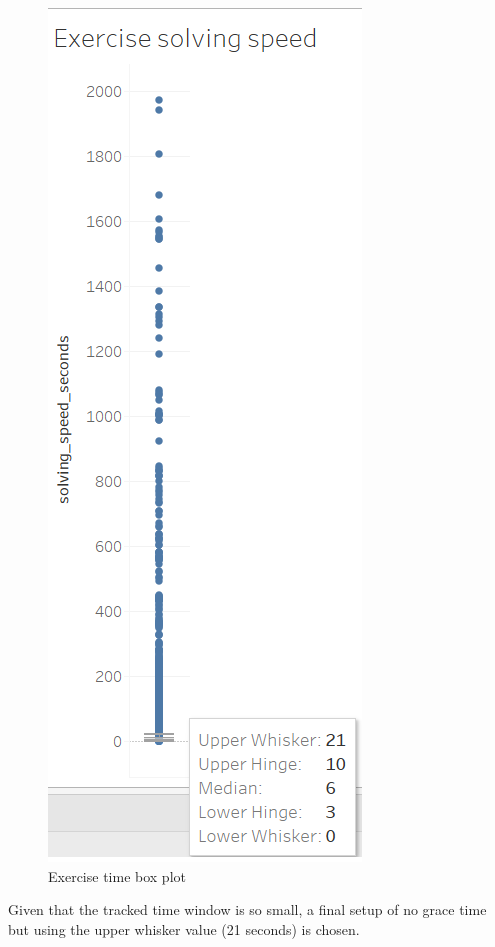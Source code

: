 \begin{figure}[bth]
	\centering
	\includegraphics[width=0.2\linewidth]{gfx/exercise_solving_speed}
	\caption{Exercise time box plot}\label{fig:exercise_solving_speed}
\end{figure}

Given that the tracked time window is so small, a final setup of no grace time but using the upper whisker value (21 seconds) is chosen.
